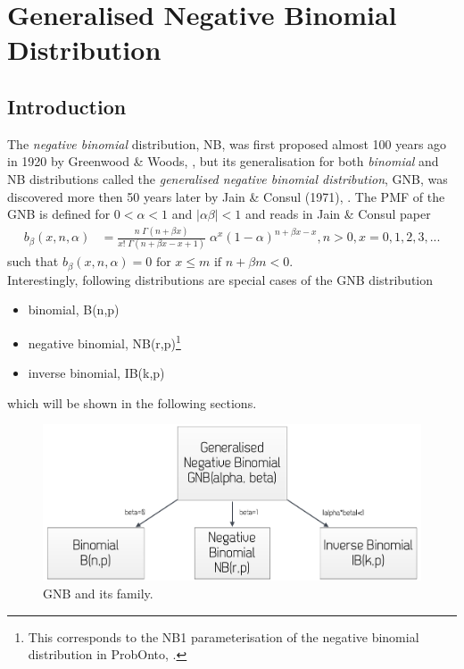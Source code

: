 \newpage
\section{Generalised Negative Binomial Distribution}
\subsection*{Introduction}
The \emph{negative binomial} distribution, NB, was first proposed almost 
100 years ago in 1920 by Greenwood \& Woods, \cite{greenwood1920inquiry}, 
but its generalisation for both \emph{binomial} and NB distributions called the 
\emph{generalised negative binomial distribution}, GNB, was discovered 
more then 50 years later by Jain \& Consul (1971), \cite{jain1971generalized}. 
The PMF of the GNB is defined for $0<\alpha<1$ and $|\alpha \beta| < 1$ 
and reads in Jain \& Consul paper
\begin{align*}
b_{\beta}(x,n,\alpha) &= 
\frac{n \; \Gamma(n+\beta x)}{x! \;\Gamma(n + \beta x - x +1)}  \; \alpha^x (1-\alpha)^{n+\beta x-x}, n>0, x=0,1,2,3,...
\end{align*}
such that $b_{\beta}(x,n,\alpha) = 0 \text{ for } x \leq m \text{ if } n+\beta m < 0.$\\
Interestingly, following distributions are special cases of the GNB distribution
\begin{itemize}
\item 
binomial, B(n,p)
\item 
negative binomial, NB(r,p)\footnote{This corresponds to the NB1 parameterisation 
of the negative binomial distribution in ProbOnto, \cite{Swat:2015a}.}
\item 
inverse binomial, IB(k,p)
\end{itemize}
which will be shown in the following sections. 

\begin{figure}[ht!]
\centering
  \includegraphics[width=120mm]{pics/GNBspecialCases.pdf}
 \caption{GNB and its family.}
 \label{fig:GNBspecialCases}
\end{figure}


